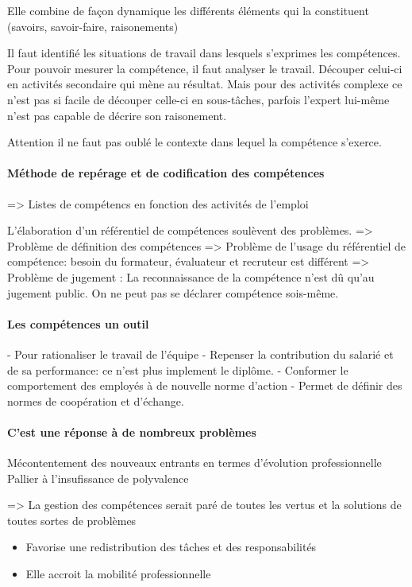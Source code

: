 Elle combine de façon dynamique les différents éléments qui la constituent (savoirs, savoir-faire, raisonements) 

Il faut identifié les situations de travail dans lesquels s'exprimes les compétences. 
Pour pouvoir mesurer la compétence, il faut analyser le travail. Découper celui-ci en activités secondaire qui mène au résultat.
Mais pour des activités complexe ce n'est pas si facile de découper celle-ci en sous-tâches, parfois l'expert lui-même n'est pas capable de décrire son raisonement.

Attention il ne faut pas oublé le contexte dans lequel la compétence s'exerce. 

\paragraph{Méthode de repérage et de codification des compétences}



=> Listes de compétencs en fonction des activités de l'emploi

L'élaboration d'un référentiel de compétences soulèvent des problèmes. 
=> Problème de définition des compétences 
=> Problème de l'usage du référentiel de compétence: besoin du formateur, évaluateur et recruteur est différent
=> Problème de jugement : La reconnaissance de la compétence n'est dû qu'au jugement public. On ne peut pas se déclarer compétence sois-même. 



\paragraph{Les compétences un outil}
- Pour rationaliser le travail de l'équipe
- Repenser la contribution du salarié et de sa performance: ce n'est plus implement le diplôme. 
- Conformer le comportement des employés à de nouvelle norme d'action 
- Permet de définir des normes de coopération et d'échange. 

\paragraph{C'est une réponse à de nombreux problèmes}
Mécontentement des nouveaux entrants en termes d'évolution professionnelle
Pallier à l'insufissance de polyvalence

=> La gestion des compétences serait paré de toutes les vertus et la solutions de toutes sortes de problèmes

\begin{itemize}
    \item Favorise une redistribution des tâches et des responsabilités
    \item Elle accroit la mobilité professionnelle
\end{itemize}



